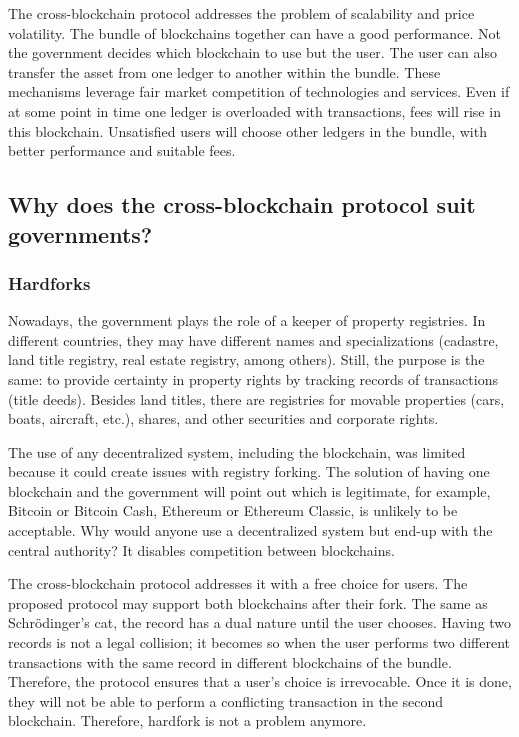 \begin{multicols}{2}
The cross-blockchain protocol addresses the problem of scalability and price volatility. The bundle of blockchains together can have a good performance. Not the government decides which blockchain to use but the user. The user can also transfer the asset from one ledger to another within the bundle. These mechanisms leverage fair market competition of technologies and services. Even if at some point in time one ledger is overloaded with transactions, fees will rise in this blockchain. Unsatisfied users will choose other ledgers in the bundle, with better performance and suitable fees.

\subsection{Why does the cross-blockchain protocol suit governments?}\label{subsec-5.2}

\subsubsection{Hardforks}\label{subsubsec-5.2.1}

Nowadays, the government plays the role of a keeper of property registries. In different countries, they may have different names and specializations (cadastre, land title registry, real estate registry, among others). Still, the purpose is the same: to provide certainty in property rights by tracking records of transactions (title deeds). Besides land titles, there are registries for movable properties (cars, boats, aircraft, etc.), shares, and other securities and corporate rights.

The use of any decentralized system, including the blockchain, was limited because it could create issues with registry forking. The solution of having one blockchain and the government will point out which is legitimate, for example, Bitcoin or Bitcoin Cash, Ethereum or Ethereum Classic, is unlikely to be acceptable. Why would anyone use a decentralized system but end-up with the central authority? It disables competition between blockchains.

The cross-blockchain protocol addresses it with a free choice for users. The proposed protocol may support both blockchains after their fork. The same as Schrödinger’s cat, the record has a dual nature until the user chooses. Having two records is not a legal collision; it becomes so when the user performs two different transactions with the same record in different blockchains of the bundle. Therefore, the protocol ensures that a user’s choice is irrevocable. Once it is done, they will not be able to perform a conflicting transaction in the second blockchain. Therefore, hardfork is not a problem anymore.


\end{multicols}
